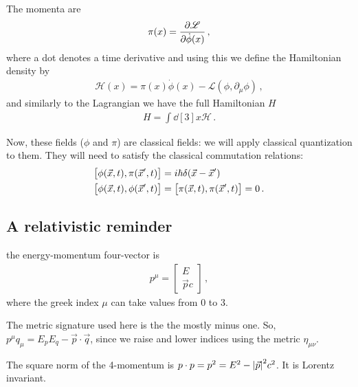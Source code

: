 \documentclass[main.tex]{subfiles}
\begin{document}
The momenta are 
%
\begin{align}
\pi (x) = \pdv{\mathscr{L}}{\dot{\phi} (x)}
\,,
\end{align}
%
where a dot denotes a time derivative
and using this we define the Hamiltonian density by 
%
\begin{align}
\mathscr{H} (x) = \pi (x) \dot{\phi} (x) - \mathscr{L}(\phi, \partial_{\mu }\phi )
\,,
\end{align}
%
and similarly to the Lagrangian we have the full Hamiltonian \(H\)
%
\begin{align}
H = \int \dd[3]{x} \mathscr{H}
\,.
\end{align}

Now, these fields (\(\phi \) and \(\pi \)) are classical fields: we will apply classical quantization to them. 
They will need to satisfy the classical commutation relations: 
%
\begin{subequations}
\begin{align}
\qty[\phi (\vec{x}, t), \pi (\vec{x}', t)] &= i \hbar \delta (\vec{x} - \vec{x}')  \\
\qty[\phi (\vec{x}, t), \phi  (\vec{x}', t)] &=
\qty[\pi (\vec{x}, t), \pi  (\vec{x}', t)] = 0
\,.
\end{align}
\end{subequations}
%

\subsection{A relativistic reminder}


the energy-momentum four-vector is 
%
\begin{subequations}
\begin{align}
p^{\mu } = \left[\begin{array}{c}
E \\ \vec{p} c
\end{array}\right]
\,,
\end{align}
\end{subequations}
%
where the greek index \(\mu \) can take values from 0 to 3. 

The metric signature used here is the the mostly minus one. So, \(p^{\mu } q_{\mu } = E_{p} E_{q} - \vec{p} \cdot \vec{q}\), since we raise and lower indices using the metric \(\eta_{\mu \nu }\). 

The square norm of the 4-momentum is \(p \cdot p  = p^2 = E^2 - \abs{\vec{p}}^2 c^2\). It is Lorentz invariant.
\end{document}
